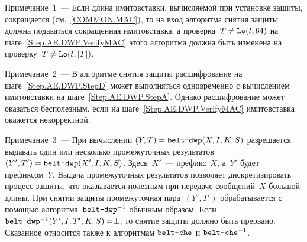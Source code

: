 \begin{note}
Примечание~1~--- Если длина имитовставки, вычисляемой при установке защиты, 
сокращается (см.~\ref{COMMON.MAC}), то на вход алгоритма снятия 
защиты должна подаваться сокращенная имитовставка, а проверка~$T\neq\mathop{\texttt{Lo}}\nolimits(t,64)$ 
на шаге~\ref{Step.AE.DWP.VerifyMAC} этого алгоритма должна быть изменена на 
проверку~$T\neq\mathop{\texttt{Lo}}\nolimits(t,|T|)$.
\end{note}

\begin{note}
Примечание~2~--- В алгоритме снятия защиты расшифрование на 
шаге~\ref{Step.AE.DWP.StepD} может выполняться одновременно 
с вычислением имитовставки на шаге~\ref{Step.AE.DWP.StepA}. 
Однако расшифрование может оказаться бесполезным, если на 
шаге~\ref{Step.AE.DWP.VerifyMAC} имитовставка окажется некорректной.
\end{note}

\begin{note}
Примечание~3~--- При вычислении $(Y,T)=\texttt{belt-dwp}(X,I,K,S)$ 
разрешается выдавать один или несколько промежуточных результатов 
$(Y',T')=\texttt{belt-dwp}(X',I,K,S)$. 
%
Здесь~$X'$~--- префикс~$X$, а~$Y'$ будет префиксом~$Y$.
%
Выдача промежуточных результатов позволяет дискретизировать процесс защиты, 
что оказывается полезным при передаче сообщений~$X$ большой длины.
%
При снятии защиты промежуточная пара~$(Y',T')$ обрабатывается с 
помощью алгоритма~$\texttt{belt-dwp}^{-1}$ обычным образом. 
%
Если $\texttt{belt-dwp}^{-1}(Y',I,T',K,S)=\perp$, то снятие 
защиты должно быть прервано.
%
Сказанное относится также к алгоритмам $\texttt{belt-che}$ и $\texttt{belt-che}^{-1}$.
\end{note}


